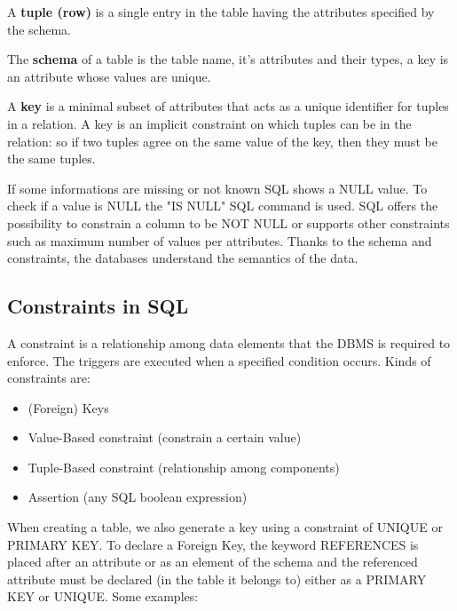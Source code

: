 \documentclass[a4page, 11pt]{article}
\theoremstyle{definition}
\begin{document}
A \textbf{tuple (row)} is a single entry in the table having the attributes specified by the schema.

The \textbf{schema} of a table is the table name, it's attributes and their types, a key is an attribute whose values are unique. 

A \textbf{key} is a minimal subset of attributes that acts as a unique identifier for tuples in a relation.  A key is an implicit constraint on which tuples can be in the relation: so if two tuples agree on the same value of the key, then they must be the same tuples. 

If some informations are missing or not known SQL shows a NULL value.
To check if a value is NULL the "IS NULL" SQL command is used. 
SQL offers the possibility to constrain a column to be NOT NULL or supports other constraints such as maximum number of values per attributes.
Thanks to the schema and constraints, the databases understand the semantics of the data.

\subsection{Constraints in SQL}
A constraint is a relationship among data elements that the DBMS is required to enforce. The triggers are executed when a specified condition occurs. %
Kinds of constraints are:
\begin{itemize}[noitemsep]
	\item (Foreign) Keys
	\item Value-Based constraint (constrain a certain value)
	\item Tuple-Based constraint (relationship among components)
	\item Assertion (any SQL boolean expression)
\end{itemize}
When creating a table, we also generate a key using a constraint of UNIQUE or PRIMARY KEY. 
To declare a Foreign Key, the keyword REFERENCES is placed after an attribute or as an element of the schema and the referenced attribute must be declared (in the table it belongs to) either as a PRIMARY KEY or UNIQUE. 
Some examples:
\end{document}
